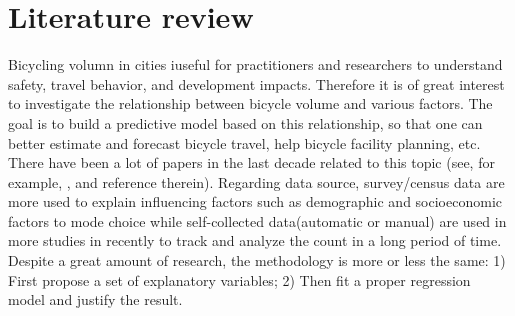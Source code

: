 \documentclass[12pt,letterpaper,article,twocolumn]{memoir}
\begin{document}
\section*{Literature review}
% 
% 

Bicycling volumn in cities iuseful for practitioners and researchers
to understand safety, travel behavior, and development impacts.
Therefore it is of great interest to investigate the relationship
between bicycle volume and various factors. The goal is to build a
predictive model based on this relationship, so that one can better
estimate and forecast bicycle travel, help bicycle facility planning,
etc. There have been a lot of papers in the last decade related to
this topic (see, for example,
\cite{Griswold:2011aa,Fields:2012aa,Niemeier:1996aa,Nosal:2014aa}, and
reference therein). Regarding data source, survey/census data are more
used to explain influencing factors such as demographic and
socioeconomic factors to mode choice \cite{Parkin:2008aa,Helbich:2014aa} while
self-collected data(automatic or manual) are used in more studies in
recently to track and analyze the count in a long period of
time\cite{Griswold:2011aa,Nosal:2014aa}. Despite a great amount of research,
the methodology is more or less the same: 1) First propose a set of
explanatory variables; 2) Then fit a proper regression model and
justify the result.
\end{document}
